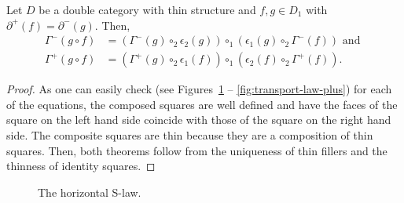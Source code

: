 \begin{lemma} \label{thm:dbl-cat-transport}
Let $D$ be a double category with thin structure and $f, g \in D_1$ with
$\partial^+(f) = \partial^-(g)$. Then,
\begin{align*}
\Gamma^-(g \circ f)
	&= (\Gamma^-(g) \circ_2 \epsilon_2(g)) \circ_1 (\epsilon_1(g) \circ_2 \Gamma^-(f))
	\text{ and } \\
\Gamma^+(g \circ f)
	&= (\Gamma^+(g) \circ_2 \epsilon_1(f)) \circ_1 (\epsilon_2(f) \circ_2 \Gamma^+(f))
	\text{.}
\end{align*}
\end{lemma}
\begin{proof}
As one can easily check (see Figures~\ref{fig:s-law-horiz} --
\ref{fig:transport-law-plus}) for each of the equations,
the composed squares are well defined and have the faces of the square on the left
hand side coincide with those of the square on the right hand side.
The composite squares are thin because they are a composition of thin squares.
Then, both theorems follow from the uniqueness of thin fillers and the thinness
of identity squares.
\end{proof}

\begin{figure}\centering
{}
\caption{The horizontal S-law.}
\label{fig:s-law-horiz}
\end{figure}


